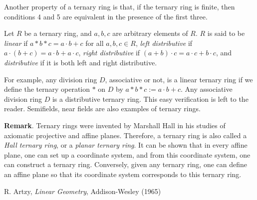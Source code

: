 \documentclass[12pt]{article}
\begin{document}
Another property of a ternary ring is that, if the ternary ring is finite, then conditions 4 and 5 are equivalent in the presence of the first three.

Let $R$ be a ternary ring, and $a,b,c$ are arbitrary elements of $R$.  $R$ is said to be \emph{linear} if $a*b*c = a\cdot b+c$ for all $a,b,c\in R$, \emph{left distributive} if $a\cdot (b+c)=a\cdot b+a\cdot c$, \emph{right distributive} if $(a+b)\cdot c = a\cdot c +b\cdot c$, and \emph{distributive} if it is both left and right distributive.

For example, any division ring $D$, associative or not, is a linear ternary ring if we define the ternary operation $*$ on $D$ by $a*b*c:=a\cdot b+c$.  Any associative division ring $D$ is a distributive ternary ring.  This easy verification is left to the reader.  Semifields, near fields are also examples of ternary rings.

\textbf{Remark}.  Ternary rings were invented by Marshall Hall in his studies of axiomatic projective and affine planes.  Therefore, a ternary ring is also called a \emph{Hall ternary ring}, or a \emph{planar ternary ring}.  It can be shown that in every affine plane, one can set up a coordinate system, and from this coordinate system, one can construct a ternary ring.  Conversely, given any ternary ring, one can define an affine plane so that its coordinate system corresponds to this ternary ring.

\begin{thebibliography}{7}
 R. Artzy, {\it Linear Geometry}, Addison-Wesley (1965)
\end{thebibliography}
\end{document}
